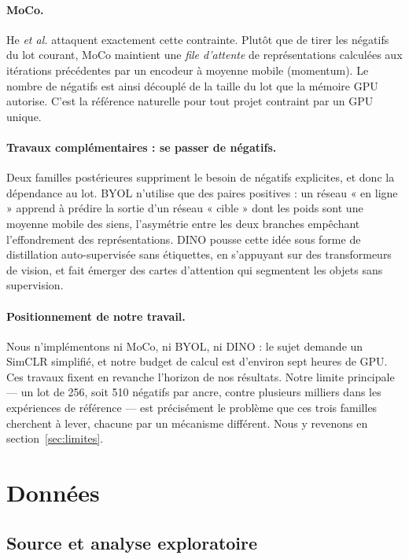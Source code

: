 \documentclass[11pt,a4paper]{article}
\begin{document}
\paragraph{MoCo.} He \emph{et al.} \cite{he2020moco} attaquent exactement cette contrainte.
Plutôt que de tirer les négatifs du lot courant, MoCo maintient une \emph{file d'attente}
de représentations calculées aux itérations précédentes par un encodeur à moyenne mobile
(momentum). Le nombre de négatifs est ainsi découplé de la taille du lot que la mémoire GPU
autorise. C'est la référence naturelle pour tout projet contraint par un GPU unique.

\paragraph{Travaux complémentaires : se passer de négatifs.} Deux familles postérieures
suppriment le besoin de négatifs explicites, et donc la dépendance au lot. BYOL
\cite{grill2020byol} n'utilise que des paires positives : un réseau « en ligne » apprend à
prédire la sortie d'un réseau « cible » dont les poids sont une moyenne mobile des siens,
l'asymétrie entre les deux branches empêchant l'effondrement des représentations. DINO
\cite{caron2021dino} pousse cette idée sous forme de distillation auto-supervisée sans
étiquettes, en s'appuyant sur des transformeurs de vision, et fait émerger des cartes
d'attention qui segmentent les objets sans supervision.

\paragraph{Positionnement de notre travail.} Nous n'implémentons ni MoCo, ni BYOL, ni DINO :
le sujet demande un SimCLR simplifié, et notre budget de calcul est d'environ sept heures de
GPU. Ces travaux fixent en revanche l'horizon de nos résultats. Notre limite principale --- un
lot de 256, soit 510 négatifs par ancre, contre plusieurs milliers dans les
expériences de référence --- est précisément le problème que ces trois familles cherchent à
lever, chacune par un mécanisme différent. Nous y revenons en section~\ref{sec:limites}.

\section{Données}
\label{sec:donnees}

\subsection{Source et analyse exploratoire}
\end{document}
